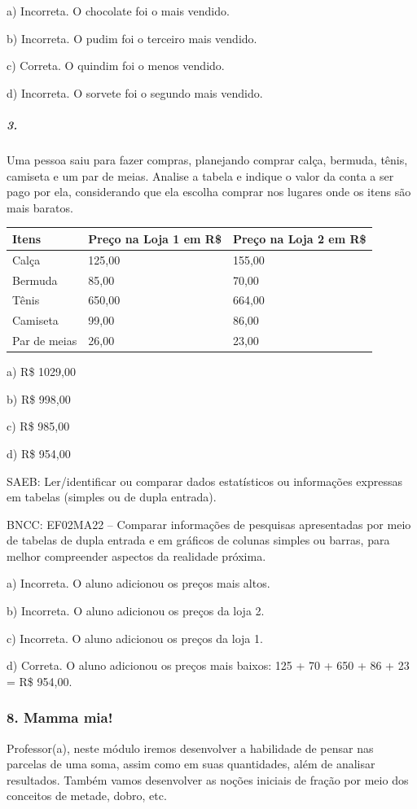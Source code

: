 a) Incorreta. O chocolate foi o mais vendido.

b) Incorreta. O pudim foi o terceiro mais vendido.

c) Correta. O quindim foi o menos vendido.

d) Incorreta. O sorvete foi o segundo mais vendido.

\subparagraph{3.}\label{section-88}

Uma pessoa saiu para fazer compras, planejando comprar calça, bermuda, tênis, camiseta e um par de meias. Analise a tabela e indique o valor da conta a ser pago por ela, considerando que ela escolha comprar nos lugares onde os
itens são mais baratos.

\begin{longtable}[]{@{}lll@{}}
\toprule
Itens & Preço na Loja 1 em R\$ & Preço na Loja 2 em R\$\tabularnewline
\midrule
\endhead
Calça & 125,00 & 155,00\tabularnewline
Bermuda & 85,00 & 70,00\tabularnewline
Tênis & 650,00 & 664,00\tabularnewline
Camiseta & 99,00 & 86,00\tabularnewline
Par de meias & 26,00 & 23,00\tabularnewline
\bottomrule
\end{longtable}

a) R\$ 1029,00

b) R\$ 998,00

c) R\$ 985,00

d) R\$ 954,00

SAEB: Ler/identificar ou comparar dados estatísticos ou
informações expressas em tabelas (simples ou de dupla entrada).

BNCC: EF02MA22 -- Comparar informações de pesquisas apresentadas por meio
de tabelas de dupla entrada e em gráficos de colunas simples ou barras, para melhor
compreender aspectos da realidade próxima.

a) Incorreta. O aluno adicionou os preços mais altos.

b) Incorreta. O aluno adicionou os preços da loja 2.

c) Incorreta. O aluno adicionou os preços da loja 1.

d) Correta. O aluno adicionou os preços mais baixos: 125 + 70 + 650 + 86
+ 23 = R\$ 954,00.

\subsubsection{8. Mamma mia!}\label{muxf3dulo-8-mamma-mia}

Professor(a), neste módulo iremos desenvolver a habilidade de pensar
nas parcelas de uma soma, assim como em suas quantidades, além de analisar resultados.
Também vamos desenvolver as noções iniciais de fração por meio dos
conceitos de metade, dobro, etc. 

